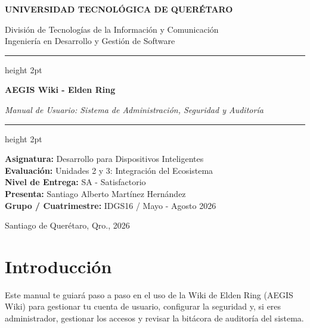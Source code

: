 \documentclass[11pt,a4paper]{article}
\begin{document}
\begin{titlepage}
    \centering
    \vspace*{0.5cm}
    {\fontsize{18}{22}\selectfont \textbf{UNIVERSIDAD TECNOLÓGICA DE QUERÉTARO} \par}
    \vspace{0.6cm}
    {\fontsize{14}{17}\selectfont División de Tecnologías de la Información y Comunicación \\ 
    Ingeniería en Desarrollo y Gestión de Software \par}
    \vspace{1.5cm}
    
    {\color{brown}\hrule height 2pt}
    \vspace{0.6cm}
    {\fontsize{20}{24}\selectfont \textbf{AEGIS Wiki - Elden Ring} \par}
    \vspace{0.4cm}
    {\fontsize{16}{20}\selectfont \textit{Manual de Usuario: Sistema de Administración, Seguridad y Auditoría} \par}
    \vspace{0.6cm}
    {\color{brown}\hrule height 2pt}
    
    \vspace{1.5cm}
    {\fontsize{12}{15}\selectfont
    \textbf{Asignatura:} Desarrollo para Dispositivos Inteligentes \\
    \vspace{0.2cm}
    \textbf{Evaluación:} Unidades 2 y 3: Integración del Ecosistema \\
    \vspace{0.2cm}
    \textbf{Nivel de Entrega:} SA - Satisfactorio \\
    \vspace{0.2cm}
    \textbf{Presenta:} Santiago Alberto Martínez Hernández \\
    \vspace{0.2cm}
    \textbf{Grupo / Cuatrimestre:} IDGS16 / Mayo - Agosto 2026 \par}
    
    \vfill
    {\large Santiago de Querétaro, Qro., 2026 \par}
\end{titlepage}

\newpage

\section{Introducción}
Este manual te guiará paso a paso en el uso de la Wiki de Elden Ring (AEGIS Wiki) para gestionar tu cuenta de usuario, configurar la seguridad y, si eres administrador, gestionar los accesos y revisar la bitácora de auditoría del sistema.
\end{document}

